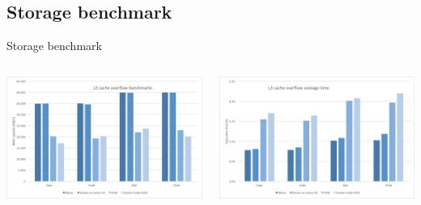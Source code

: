 \subsection{Storage benchmark}
\begin{frame}{Storage benchmark}
	\begin{columns}
		\begin{column}{0.5\textwidth}
			\centering{}
			\includegraphics[scale=0.27]{images/storage-l3-capacity.png}
		\end{column}
		\begin{column}{0.5\textwidth}
			\centering{}
			\includegraphics[scale=0.27]{images/storage-l3-time.png}
		\end{column}
	\end{columns}
\end{frame}

